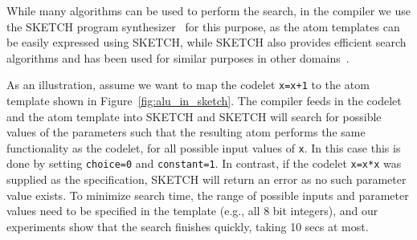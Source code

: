 While many algorithms can be used to perform the search, in the \pktlanguage
compiler we use the SKETCH program synthesizer~\cite{sketch_asplos} for this
purpose, as the atom templates can be easily expressed using SKETCH, while
SKETCH also provides efficient search algorithms and has been used for similar
purposes in other domains~\cite{bitstreaming, lifejoin, qbs, chlorophyll}.

As an illustration, assume we want to map the codelet {\tt x=x+1} to the atom
template shown in Figure~\ref{fig:alu_in_sketch}. The \pktlanguage compiler
feeds in the codelet and the atom template into SKETCH and SKETCH will search
for possible values of the parameters such that the resulting atom performs the
same functionality as the codelet, for all possible input values of {\tt x}.
In this case this is done by setting {\tt choice=0} and {\tt constant=1}.  In
contrast, if the codelet {\tt x=x*x} was supplied as the specification, SKETCH
will return an error as no such parameter value exists. To minimize search
time, the range of possible inputs and parameter values need to be specified in
the template (e.g., all 8 bit integers), and our experiments show that the
search finishes quickly, taking 10 secs at most.


